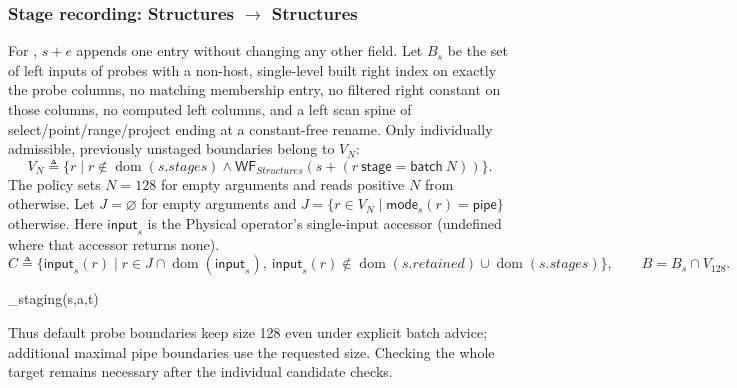 \subsubsection{Stage recording: Structures $\to$ Structures}
For , $s+e$ appends one entry without changing any other field.
Let $B_s$ be the set of left inputs of probes with a non-host, single-level
built right index on exactly the probe columns, no matching membership entry,
no filtered right constant on those columns, no computed left columns, and a
left scan spine of select/point/range/project ending at a constant-free rename.
Only individually admissible, previously unstaged boundaries belong to $V_N$:
\[
 V_N\triangleq\{r\mid r\notin\operatorname{dom}(s.stages)\land
                   \mathsf{WF}_{Structures}(s+(r\ \mathsf{stage}=\mathsf{batch}\ N))\}.
\]
The policy sets $N=128$ for empty arguments and reads positive $N$ from
 otherwise. Let $J=\varnothing$ for empty arguments and
$J=\{r\in V_N\mid\mathsf{mode}_s(r)=\mathsf{pipe}\}$ otherwise.
Here $\mathsf{input}_s$ is the Physical operator's single-input accessor
(undefined where that accessor returns none).
\[
 C\triangleq\{\mathsf{input}_s(r)\mid r\in J\cap\operatorname{dom}(\mathsf{input}_s),\
       \mathsf{input}_s(r)\notin
       \operatorname{dom}(s.retained)\cup\operatorname{dom}(s.stages)\},
 \qquad B=B_s\cap V_{128}.
\]
\begin{mathpar}
 {_{staging}(s,a,t)}
\end{mathpar}
Thus default probe boundaries keep size 128 even under explicit batch advice;
additional maximal pipe boundaries use the requested size. Checking the whole
target remains necessary after the individual candidate checks.


